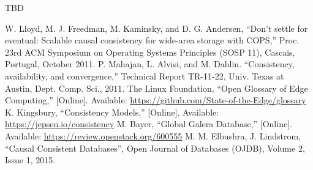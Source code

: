 \documentclass[conference]{IEEEtran}
\begin{document}
TBD

\begin{thebibliography}{00}
 W. Lloyd, M. J. Freedman, M. Kaminsky, and D. G. Andersen, ``Don’t settle for eventual: Scalable causal consistency for wide-area storage with COPS,'' Proc. 23rd ACM Symposium on Operating Systems Principles (SOSP 11), Cascais, Portugal, October 2011.
 P. Mahajan, L. Alvisi, and M. Dahlin. ``Consistency, availability, and convergence,'' Technical Report TR-11-22, Univ. Texas at Austin, Dept. Comp. Sci., 2011.
 The Linux Foundation, ``Open Glossary of Edge Computing,'' [Online]. Available: \url{https://github.com/State-of-the-Edge/glossary}
 K. Kingsbury, ``Consistency Models,'' [Online]. Available: \url{https://jepsen.io/consistency}
 M. Bayer, ``Global Galera Database,'' [Online]. Available: \url{https://review.openstack.org/600555}
 M. M. Elbushra, J. Lindstrom, ``Causal Consistent Databases'', Open Journal of Databases (OJDB), Volume 2, Issue 1, 2015.
\end{thebibliography}
\end{document}
